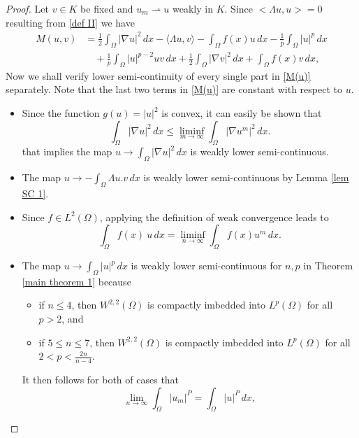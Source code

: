 \documentclass[reqno]{amsart}
\begin{document}
\begin{proof}
 Let \( v \in  K\) be fixed and \(u_m\rightharpoonup u\) weakly in \(K\).
Since $<\Lambda u , u> = 0 $ resulting from \eqref{def II} we have
\begin{equation}\label{M(u)}
\begin{aligned}
M(u,v)
& =\frac{1}{2}\int_{\Omega} |\nabla u|^2\,dx -\langle\Lambda u , v\rangle
 -\int_{\Omega} f(x)u\,dx-\frac{1}{p}\int_{\Omega}  |u|^{p}\,dx  \\
&\quad +  \frac{1}{p}\int_{\Omega}  |u|^{p-2}uv\,dx+ \frac{1}{2}
\int_{\Omega} |\nabla v|^2\,dx+\int_{\Omega} f(x)v\,dx,
\end{aligned}
\end{equation}
Now we shall verify lower semi-continuity of every single part in \eqref{M(u)} separately.
Note that the last two terms in \eqref{M(u)} are constant  with respect to  $u$.
\begin{itemize}
 \item Since the function \(g(u) = |u|^2 \) is convex, it can easily be shown that
\[
 \int_{\Omega}|\nabla u|^2\,dx\leq \liminf_{m \to \infty}\int_{\Omega}|\nabla u^m|^2\,dx .
\]
 that implies the map \( u\to\int_{\Omega}|\nabla u|^2  \,dx\) is weakly lower
 semi-continuous.

 \item The map \( u\to-\int_{\Omega}\Lambda u. v \,dx\) is weakly lower semi-continuous
 by Lemma \ref{lem SC 1}.

 \item  Since \(f \in L^2(\Omega)\), applying the definition of weak convergence
 leads to
 \[
 \int_{\Omega}f(x)\  u  \,dx=\liminf_{n\to \infty}\int_{\Omega}f(x) u^m\,dx.
 \]

 \item The map \( u\to\int_{\Omega}|u|^p\,dx\) is weakly lower semi-continuous for
 \( n,p \) in Theorem \ref{main theorem 1} because
\begin{itemize}
       \item[(i)] if \(n\leq 4\), then  \(W^{2,2}(\Omega)\) is compactly imbedded
       into \( L^p(\Omega)\) for all \(  p>2\), and
       \item[(ii)] if \(5\leq n\leq 7\), then \(W^{2,2}(\Omega)\) is compactly imbedded
       into \( L^p(\Omega)\) for all \( 2<p< \frac{2n}{n-4}\).
\end{itemize}

It then follows for both of cases that
\[
\lim_{n\to \infty}\int_{\Omega}| u_m|^P=\int_{\Omega}| u|^P\,dx ,
\]


\end{itemize}
\end{proof}
\end{document}
